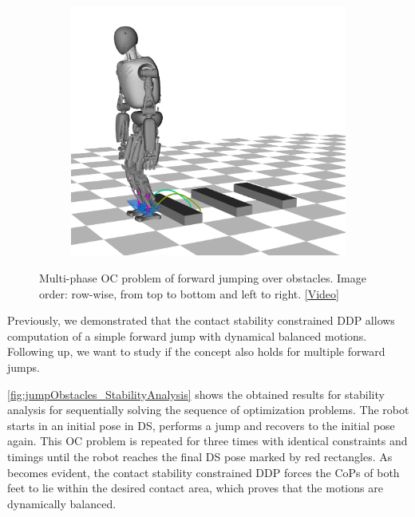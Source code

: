 \begin{figure}[h!]
\begin{subfigure}{.33\textwidth}
	\includegraphics[width=.95\linewidth]{fig/jumpObstacles/snaps/7x}
	\caption{}
\end{subfigure}%
\caption[Multi-phase \gls{OC} problem of forward jumping over obstacles]{Multi-phase \gls{OC} problem of forward jumping over obstacles. Image order: row-wise, from top to bottom and left to right. \href{https://github.com/julesser/ma-thesis-simulation-results/blob/master/Jump_MultipleObstacles_NoJLimsNoTLims/crocoddyl.mp4}{[Video]}}
\label{fig:jumpObstacles_Snaps}
\end{figure} 

Previously, we demonstrated that the contact stability constrained \gls{DDP} allows computation of a simple forward jump with dynamical balanced motions. Following up, we want to study if the concept also holds for multiple forward jumps. 

\cref{fig:jumpObstacles_StabilityAnalysis} shows the obtained results for stability analysis for sequentially solving the sequence of optimization problems. The robot starts in an initial pose in \gls{DS}, performs a jump and recovers to the initial pose again. This \gls{OC} problem is repeated for three times with identical constraints and timings until the robot reaches the final \gls{DS} pose marked by red rectangles. As becomes evident, the contact stability constrained \gls{DDP} forces the \gls{CoP}s of both feet to lie within the desired contact area, which proves that the motions are dynamically balanced. 

